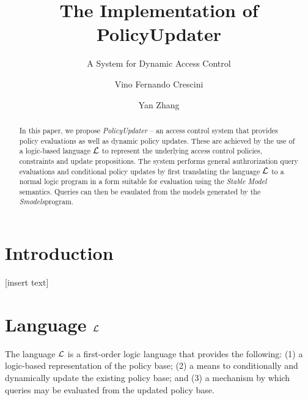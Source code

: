 \documentclass{llncs}
\begin{document}
  \long{}

  \title{The Implementation of PolicyUpdater}
  \subtitle{A System for Dynamic Access Control}

  \author{Vino Fernando Crescini \and Yan Zhang}


  \maketitle

  \begin{abstract}
    In this paper, we propose \emph{PolicyUpdater} -- an access control system
    that provides policy evaluations as well as dynamic policy updates.
    These are achieved by the use of a logic-based language $\cal{L}$ to
    represent the underlying access control policies, constraints and update
    propositions. The system performs general authrorization query evaluations
    and conditional policy updates by first translating the language $\cal{L}$
    to a normal logic program in a form suitable for evaluation using the
    \emph{Stable Model} semantics. Queries can then be evaulated from the
    models generated by the \emph{Smodels}\footnotemark program.

  \end{abstract}

  \section{Introduction}
    [insert text]

    \pagebreak

  \section{Language $\cal{L}$}

    The language $\cal{L}$ is a first-order logic language that provides the
    following:  (1) a logic-based representation of the policy base; (2) a
    means to conditionally and dynamically update the existing policy base;
    and (3) a mechanism by which queries may be evaluated from the updated
    policy base.
\end{document}
